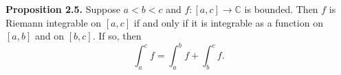 \textbf{Proposition 2.5.} Suppose $a < b < c$ and $f: [a, c] \to \mathbb{C}$ is bounded. Then $f$ is Riemann integrable on $[a, c]$ if and only if it is integrable as a function on $[a, b]$ and on $[b, c]$. If so, then
$$\int_a^c f = \int_a^b f + \int_b^c f.$$
